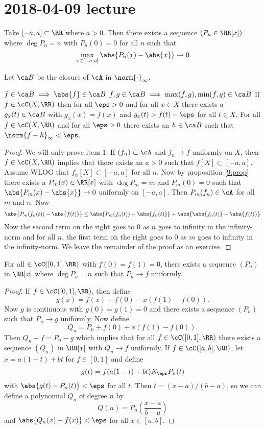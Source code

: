 \section{2018-04-09 lecture}

\begin{prop}\label{9:prop}
	Take $[-a,a] \subset \RR$ where $a>0$.
	Then there exists a sequence $(P_n \in \RR[x])$ where $\deg P_n=n$ with $P_n(0)=0$ for all $n$ such that
	\[\max_{x \in [-a,a]} \abs{P_n(x)-\abs{x}} \to 0\]
\end{prop}

\begin{prop}
	Let $\ca B$ be the closure of $\cA$ in $\norm{\cdot}_\infty$.
	\begin{enum}
		\io $f \in \ca B \implies \abs{f} \in \ca B$
		\io $f,g \in \ca B \implies \max(f,g), \min(f,g) \in \ca B$
		\io If $f \in \cC(X,\RR)$ then for all $\eps>0$ and for all $x \in X$ there exists a $g_x(t) \in \ca B$ with $g_x(x)=f(x)$ and $g_x(t)>f(t)-\eps$ for all $t \in X$.
		\io For all $f \in \cC(X,\RR)$ and for all $\eps>0$ there exists an $h \in \ca B$ such that $\norm{f-h}_\infty<\eps$.
	\end{enum}
\end{prop}

\begin{proof}
	We will only prove item 1.
	If $(f_n) \subset \cA$ and $f_n \to f$ uniformly on $X$, then$f \in \cC(X,\RR)$ implies that there exists an $a>0$ such that $f[X] \subset [-a,a]$.
	Assume WLOG that $f_n[X] \subset [-a,a]$ for all $n$.
	Now by proposition \ref{9:prop} there exists a $P_m(x) \in \RR[x]$ with $\deg P_m=m$ and $P_m(0)=0$ such that $\abs{P_m(x)-\abs{x}} \to 0$ uniformly on $[-a,a]$.
	Then $P_m(f_n) \in \cA$ for all $m$ and $n$.
	Now
	\[\abs{P_m(f_n(t))-\abs{f(t)}} \leq \abs{P_m(f_n(t))-\abs{f_n(t)}} + \abs{\abs{f_n(t)}-\abs{f(t)}}\]
	Now the second term on the right goes to $0$ as $n$ goes to infinity in the infinity-norm and for all $n$, the first term on the right goes to $0$ as $m$ goes to infinity in the infinity-norm.
	We leave the remainder of the proof as an exercise.
\end{proof}

\begin{lem}
	For all $ \in \cC([0,1],\RR)$ with $f(0)=f(1)=0$, there exists a sequence $(P_n)$ in $\RR[x]$ where $\deg P_n=n$ such that $P_n \to f$ uniformly.
\end{lem}

\begin{proof}
	If $f \in \cC([0,1],\RR)$, then define
	\[g(x) = f(x)-f(0)-x(f(1)-f(0)).\]
	Now $g$ is continuous with $g(0)=g(1)=0$ and there exists a sequence $(P_n)$ such that $P_n \to g$ uniformly.
	Now define
	\[Q_n = P_n+f(0)+x(f(1)-f(0)).\]
	Then $Q_n-f=P_n-g$ which implies that for all $f \in \cC([0,1],\RR)$ there exists a sequence $(Q_n)$ in $\RR[x]$ with $Q_n \to f$ uniformly.
	If $f \in \cC([a,b],\RR)$, let $x = a(1-t)+bt$ for $f \in [0,1]$ and define
	\[g(t) = f(a(1-t)+bt) N_\eps P_n(t)\]
	with $\abs{g(t)-P_n(t)}<\eps$ for all $t$.
	Then $t=(x-a)/(b-a)$, so we can define a polynomial $Q_n$ of degree $n$ by
	\[Q(n) = P_n\left(\frac{x-a}{b-a}\right)\]
	and $\abs{Q_n(x) - f(x)}<\eps$ for all $x \in [a,b]$.
\end{proof}

